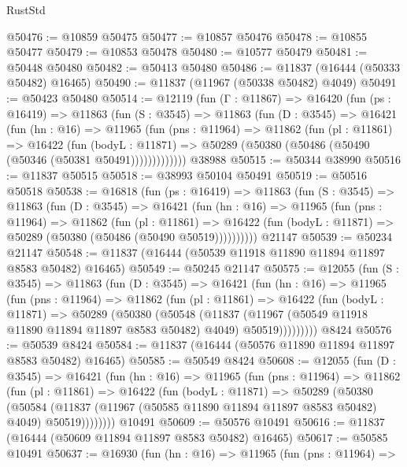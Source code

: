 \begin{lexlean}{RustStd}
\begin{coremodule}
{\begin{coremodule}
{{{{{{{{{{{{{{{{{{{{{{{{{{{{{{{{{{{{{{{{{{{{{{{{{{@50476 := @10859 @50475
@50477 := @10857 @50476
@50478 := @10855 @50477
@50479 := @10853 @50478
@50480 := @10577 @50479
@50481 := @50448 @50480
@50482 := @50413 @50480
@50486 := @11837 (@16444 (@50333 @50482) @16465)
@50490 := @11837 (@11967 (@50338 @50482) @4049)
@50491 := @50423 @50480
@50514 := @12119
    (fun (Γ : @11867) =>
    @16420
      (fun (ps : @16419) =>
      @11863
        (fun (S : @3545) =>
        @11863
          (fun (D : @3545) =>
          @16421
            (fun (hn : @16) =>
            @11965
              (fun (pns : @11964) =>
              @11862
                (fun (pl : @11861) =>
                @16422
                  (fun (bodyL : @11871) =>
                  @50289 (@50380 (@50486 (@50490 (@50346 (@50381 @50491)))))))))))))
    @38988
@50515 := @50344 @38990
@50516 := @11837 @50515
@50518 := @38993 @50104 @50491
@50519 := @50516 @50518
@50538 := @16818
    (fun (ps : @16419) =>
    @11863
      (fun (S : @3545) =>
      @11863
        (fun (D : @3545) =>
        @16421
          (fun (hn : @16) =>
          @11965
            (fun (pns : @11964) =>
            @11862
              (fun (pl : @11861) =>
              @16422 (fun (bodyL : @11871) => @50289 (@50380 (@50486 (@50490 @50519))))))))))
    @21147
@50539 := @50234 @21147
@50548 := @11837 (@16444 (@50539 @11918 @11890 @11894 @11897 @8583 @50482) @16465)
@50549 := @50245 @21147
@50575 := @12055
    (fun (S : @3545) =>
    @11863
      (fun (D : @3545) =>
      @16421
        (fun (hn : @16) =>
        @11965
          (fun (pns : @11964) =>
          @11862
            (fun (pl : @11861) =>
            @16422
              (fun (bodyL : @11871) =>
              @50289
                (@50380
                  (@50548
                    (@11837
                      (@11967 (@50549 @11918 @11890 @11894 @11897 @8583 @50482) @4049)
                      @50519)))))))))
    @8424
@50576 := @50539 @8424
@50584 := @11837 (@16444 (@50576 @11890 @11894 @11897 @8583 @50482) @16465)
@50585 := @50549 @8424
@50608 := @12055
    (fun (D : @3545) =>
    @16421
      (fun (hn : @16) =>
      @11965
        (fun (pns : @11964) =>
        @11862
          (fun (pl : @11861) =>
          @16422
            (fun (bodyL : @11871) =>
            @50289
              (@50380
                (@50584
                  (@11837 (@11967 (@50585 @11890 @11894 @11897 @8583 @50482) @4049) @50519))))))))
    @10491
@50609 := @50576 @10491
@50616 := @11837 (@16444 (@50609 @11894 @11897 @8583 @50482) @16465)
@50617 := @50585 @10491
@50637 := @16930
    (fun (hn : @16) =>
    @11965
      (fun (pns : @11964) =>
}}}}}}}}}}}}}}}}}}}}}}}}}}}}}}}}}}}}}}}}}}}}}}}}}}
\end{coremodule}}
\end{coremodule}
\end{lexlean}
